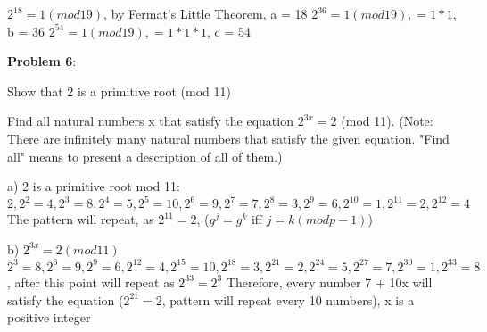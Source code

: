 \documentclass[12pt,letterpaper,final]{report}
\begin{document}
 $2^{18} = 1 (mod 19)$, by Fermat's Little Theorem, a = 18
\newline $2^{36} = 1(mod 19), = 1*1$, b = 36
\newline $2^{54} = 1(mod 19), = 1*1*1$, c = 54


\bigskip
\noindent\textbf{Problem 6}:
\begin{alphalist2}
	\item Show that 2 is a primitive root (mod 11)
	\item Find all natural numbers x that satisfy the equation $2^{3x} = 2$ (mod 11). (Note:  There are infinitely 	many natural numbers that satisfy the given equation. "Find all" means to present a description of all of them.)

\end{alphalist2}

a) 2 is a primitive root mod 11:
\newline $2, 2^{2} = 4, 2^{3} = 8, 2^{4} = 5, 2^{5} = 10, 2^{6} = 9, 2^{7} = 7, 2^{8} = 3, 2^{9} = 6, 2^{10} = 1, 2^{11} = 2, 2^{12} = 4$
\newline The pattern will repeat, as $2^{11} = 2$, ($g^{j} = g^{k}$ iff $j=k (mod p - 1)$)

b) $2^{3x} = 2(mod 11)$
\newline $2^{3} = 8, 2^{6} = 9, 2^{9} = 6,  2^{12} = 4,  2^{15} = 10,  2^{18} = 3,  2^{21} = 2,  2^{24} = 5,  2^{27} = 7,  2^{30} = 1,  2^{33} = 8$, after this point will repeat as $2^{33} = 2^{3}$
\newline Therefore, every number  7 + 10x will satisfy the equation ($2^{21} = 2$, pattern will repeat every 10 numbers), x is a positive integer
\end{document}
